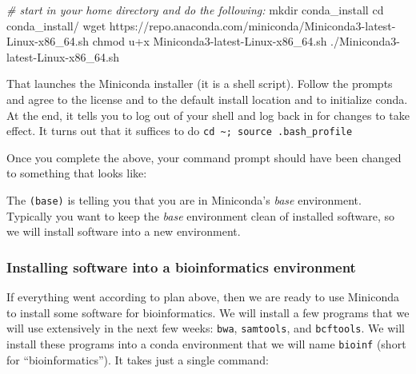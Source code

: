 \documentclass[]{krantz}
\makeatletter
\newenvironment{Shaded}{\begin{snugshade}}{\end{snugshade}}
\newcommand{\BuiltInTok}[1]{#1}
\newcommand{\CommentTok}[1]{\textcolor[rgb]{0.37,0.37,0.37}{\textit{#1}}}
\newcommand{\ExtensionTok}[1]{#1}
\newcommand{\FunctionTok}[1]{\textcolor[rgb]{0,0,0}{#1}}
\newcommand{\KeywordTok}[1]{\textcolor[rgb]{0.27,0.27,0.27}{\textbf{#1}}}
\newcommand{\NormalTok}[1]{#1}
\newenvironment{kframe}{%
\medskip{}
\setlength{\fboxsep}{.8em}
 \def\at@end@of@kframe{}%
 \ifinner\ifhmode%
  \def\at@end@of@kframe{\end{minipage}}%
  \begin{minipage}{\columnwidth}%
 \fi\fi%
 \def\FrameCommand##1{\hskip\@totalleftmargin \hskip-\fboxsep
 \colorbox{shadecolor}{##1}\hskip-\fboxsep
     \hskip-\linewidth \hskip-\@totalleftmargin \hskip\columnwidth}%
 \MakeFramed {\advance\hsize-\width
   \@totalleftmargin\z@ \linewidth\hsize
   \@setminipage}}%
 {\par\unskip\endMakeFramed%
 \at@end@of@kframe}
\renewenvironment{Shaded}{\begin{kframe}}{\end{kframe}}
\makeatother
\begin{document}
\begin{enumerate}
\begin{Shaded}
\begin{Highlighting}[]
\CommentTok{# start in your home directory and do the following:}
\FunctionTok{mkdir}\NormalTok{ conda_install}
\BuiltInTok{cd}\NormalTok{ conda_install/}
\FunctionTok{wget}\NormalTok{ https://repo.anaconda.com/miniconda/Miniconda3-latest-Linux-x86_64.sh}
\FunctionTok{chmod}\NormalTok{ u+x Miniconda3-latest-Linux-x86_64.sh }
\ExtensionTok{./Miniconda3-latest-Linux-x86_64.sh} 
\end{Highlighting}
\end{Shaded}

  That launches the Miniconda installer (it is a shell script). Follow the prompts and agree
  to the license and to the default install location and to initialize conda.
  At the end, it tells you to log out of your shell and log back in for changes to take
  effect. It turns out that it suffices to do \texttt{cd\ \textasciitilde{};\ source\ .bash\_profile}
\end{enumerate}

Once you complete the above, your command prompt should have been changed to something that looks like:

\begin{Shaded}
\end{Shaded}

The \texttt{(base)} is telling you that you are in Miniconda's \emph{base} environment. Typically you want to keep the
\emph{base} environment clean of installed software, so we will install software into a new environment.

\hypertarget{installing-software-into-a-bioinformatics-environment}{%
\subsubsection{Installing software into a bioinformatics environment}\label{installing-software-into-a-bioinformatics-environment}}

If everything went according to plan above, then we are ready to use Miniconda to
install some software for bioinformatics. We will install a few programs that we will
use extensively in the next few weeks: \texttt{bwa}, \texttt{samtools}, and \texttt{bcftools}. We will
install these programs into a conda environment that we will name \texttt{bioinf} (short
for ``bioinformatics''). It takes just a single command:
\end{document}
